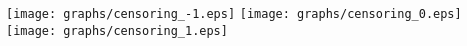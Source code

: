 \documentclass{article}
\begin{document}
\texttt{[image: graphs/censoring\_-1.eps]} \pagebreak
\texttt{[image: graphs/censoring\_0.eps]} \pagebreak
\texttt{[image: graphs/censoring\_1.eps]} \pagebreak
\end{document}
